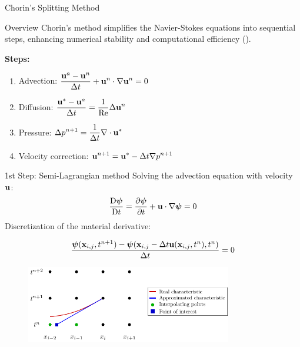 \begin{frame}{Chorin's Splitting Method}

  \begin{block}{Overview}
    Chorin's method simplifies the Navier-Stokes equations into sequential steps, enhancing numerical stability and computational efficiency (\cite{Chorin1967NumericalNS,Boyd2001ChebyshevFourier}).
  \end{block}

  \textbf{Steps:}
  \begin{enumerate}
    \item Advection: $\displaystyle\frac{\boldsymbol{\mathrm{u}}^a - \boldsymbol{\mathrm{u}}^n}{\Delta t} + \boldsymbol{\mathrm{u}}^n\cdot\nabla\boldsymbol{\mathrm{u}}^n = 0$
    \item Diffusion: $\displaystyle\frac{\boldsymbol{\mathrm{u}}^* - \boldsymbol{\mathrm{u}}^a}{\Delta t} = \frac{1}{\mathrm{Re}}\Delta\boldsymbol{\mathrm{u}}^n$
    \item Pressure: $\displaystyle\Delta p^{n+1} = \frac{1}{\Delta t}\nabla\cdot\boldsymbol{\mathrm{u}}^*$
    \item Velocity correction: $\displaystyle\boldsymbol{\mathrm{u}}^{n+1} = \boldsymbol{\mathrm{u}}^* - \Delta t\nabla p^{n+1}$
  \end{enumerate}

\end{frame}

\begin{frame}{1st Step: Semi-Lagrangian method}
  Solving the advection equation with velocity $\boldsymbol{\mathrm{u}}$:
  \begin{equation*}
    \frac{\mathrm{D}\boldsymbol{\mathrm{\psi}}}{\mathrm{D}t}=\frac{\partial \boldsymbol{\mathrm{\psi}}}{\partial t} + \boldsymbol{\mathrm{u}}\cdot\nabla\boldsymbol{\mathrm{\psi}} = 0
  \end{equation*}
  Discretization of the material derivative:

  \begin{equation*}
    \frac{\boldsymbol{\mathrm{\psi}}(\boldsymbol{\mathrm{x}}_{i,j}, t^{n+1}) - \boldsymbol{\mathrm{\psi}}(\boldsymbol{\mathrm{x}}_{i,j} - \Delta t\boldsymbol{\mathrm{u}}(\boldsymbol{\mathrm{x}}_{i,j}, t^n), t^n)}{\Delta t} = 0
  \end{equation*}
  \begin{figure}
    \centering
    \includegraphics[width=0.8\textwidth]{graphics/characteristics.pdf}
  \end{figure}
\end{frame}


